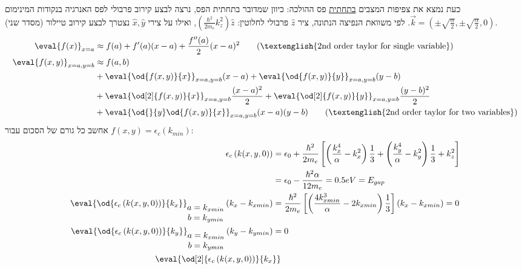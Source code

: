 \documentclass{article}
\begin{document}
\begin{Answer}
כעת נמצא את צפיפות המצבים \underline{בתחתית} פס ההולכה: כיוון שמדובר בתחתית הפס, נרצה לבצע קירוב פרבולי לפס האנרגיה בנקודות המינימום $\vec{k}=\left( \pm\sqrt{\frac{\alpha}{2}},\pm\sqrt{\frac{\alpha}{2}},0 \right)$. לפי משוואת הנפיצה הנתונה, ציר $\hat{z}$ פרבולי לחלוטין: $\left( \frac{\hbar^2}{2m_e}k_{z}^{2} \right)\hat{z}$, ואילו על צירי $\hat{x},\hat{y}$ נצטרך לבצע קירוב טיילור (מסדר שני).
\label{טור טיילור מסדר 2}
\begin{align*}
    \eval{f(x)}_{x=a}&\approx f(a)+f'(a)(x-a)+\frac{f''(a)}{2}(x-a)^2
    \tag{\textenglish{2nd order taylor for single variable}}\\
    \eval{f(x,y)}_{x=a,y=b}&\approx f(a,b)\\
    &+\eval{\od{f(x,y)}{x}}_{x=a,y=b}(x-a)+\eval{\od{f(x,y)}{y}}_{x=a,y=b}(y-b)\\
    &+\eval{\od[2]{f(x,y)}{x}}_{x=a,y=b}\frac{(x-a)^2}{2}+\eval{\od[2]{f(x,y)}{y}}_{x=a,y=b}\frac{(y-b)^2}{2}\\
    &+\eval{\od{}{y}\od{f(x,y)}{x}}_{x=a,y=b}(x-a)(y-b)
    \tag{\textenglish{2nd order taylor for two variables}}
\end{align*}
אחשב כל גורם של הסכום עבור $f(x,y)=\epsilon_{c}(k_{min})$:
\begin{align*}
    \epsilon_{c}\left(k(x,y,0)\right)&= \epsilon_{0}+\frac{\hbar^2}{2m_{e}}\left[ \left( \frac{k_{x}^4}{\alpha}-k_{x}^2 \right)\frac{1}{3}+\left( \frac{k_{y}^4}{\alpha}-k_{y}^2 \right)\frac{1}{3} + k_{z}^2\right]\\
    &= \epsilon_{0}-\frac{\hbar^2\alpha}{12m_e}=0.5eV=E_{gap}\\
    \eval{\od{\epsilon_{c}\left(k(x,y,0)\right)}{k_{x}}}_{\begin{matrix}
        a=k_{xmin}\\
        b=k_{ymin}
    \end{matrix}}\left( k_{x}-k_{xmin} \right)&= 
    \frac{\hbar^2}{2m_{e}}\left[ \left( \frac{4k_{xmin}^3}{\alpha}-2k_{xmin} \right)\frac{1}{3}\right]\left( k_{x}-k_{xmin} \right)=0\\
    \eval{\od{\epsilon_{c}\left(k(x,y,0)\right)}{k_{y}}}_{\begin{matrix}
        a=k_{xmin}\\
        b=k_{ymin}
    \end{matrix}}\left( k_{y}-k_{ymin} \right)&=0\\
    \eval{\od[2]{\epsilon_{c}\left(k(x,y,0)\right)}{k_{x}}}_{\begin{matrix}

\end{matrix}}
\end{align*}
\end{Answer}
\end{document}
